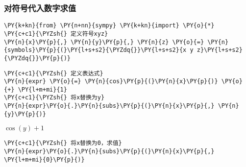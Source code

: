     \hypertarget{ux5bf9ux7b26ux53f7ux4ee3ux5165ux6570ux5b57ux6c42ux503c}{%
\subsubsection{对符号代入数字求值}\label{ux5bf9ux7b26ux53f7ux4ee3ux5165ux6570ux5b57ux6c42ux503c}}

    \begin{tcolorbox}[breakable, size=fbox, boxrule=1pt, pad at break*=1mm,colback=cellbackground, colframe=cellborder]
\begin{Verbatim}[commandchars=\\\{\}]
\PY{k+kn}{from} \PY{n+nn}{sympy} \PY{k+kn}{import} \PY{o}{*}
\PY{c+c1}{\PYZsh{} 定义符号xyz}
\PY{n}{x}\PY{p}{,} \PY{n}{y}\PY{p}{,} \PY{n}{z} \PY{o}{=} \PY{n}{symbols}\PY{p}{(}\PY{l+s+s2}{\PYZdq{}}\PY{l+s+s2}{x y z}\PY{l+s+s2}{\PYZdq{}}\PY{p}{)}
\end{Verbatim}
\end{tcolorbox}

    \begin{tcolorbox}[breakable, size=fbox, boxrule=1pt, pad at break*=1mm,colback=cellbackground, colframe=cellborder]
\begin{Verbatim}[commandchars=\\\{\}]
\PY{c+c1}{\PYZsh{} 定义表达式}
\PY{n}{expr} \PY{o}{=} \PY{n}{cos}\PY{p}{(}\PY{n}{x}\PY{p}{)} \PY{o}{+} \PY{l+m+mi}{1}
\PY{c+c1}{\PYZsh{} 将x替换为y}
\PY{n}{expr}\PY{o}{.}\PY{n}{subs}\PY{p}{(}\PY{n}{x}\PY{p}{,} \PY{n}{y}\PY{p}{)}
\end{Verbatim}
\end{tcolorbox}
 
            
    
    $\displaystyle \cos{\left(y \right)} + 1$

    

    \begin{tcolorbox}[breakable, size=fbox, boxrule=1pt, pad at break*=1mm,colback=cellbackground, colframe=cellborder]
\begin{Verbatim}[commandchars=\\\{\}]
\PY{c+c1}{\PYZsh{} 将x替换为0，求值}
\PY{n}{expr}\PY{o}{.}\PY{n}{subs}\PY{p}{(}\PY{n}{x}\PY{p}{,} \PY{l+m+mi}{0}\PY{p}{)}
\end{Verbatim}
\end{tcolorbox}
 
            
    
